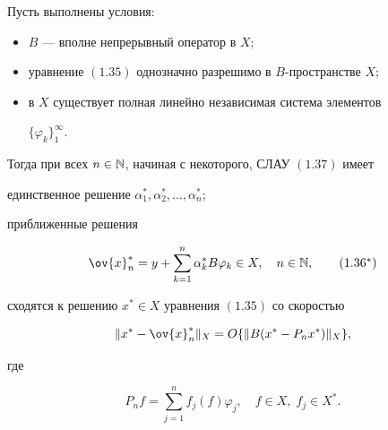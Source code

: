\begin{thms}


Пусть выполнены условия\/${:}$


\begin{itemize}


\item[а)] $B$ --- вполне непрерывный оператор в $X;$


\item[б)] уравнение $(1.35)$ однозначно разрешимо в $B$-пространстве $X;$


\item[в)] в $X$ существует полная линейно независимая система элементов


$\{\varphi_k\}_1^\infty$.


\end{itemize}


Тогда при всех $n\in \Bbb N$, начиная с некоторого, СЛАУ $(1.37)$ имеет


единственное решение $\alpha_1^*,\alpha_2^*,\dotsc ,\alpha_n^*;$


приближенные решения


\begin{equation}


\ov{x}_n^*=y+\sum_{k=1}^n\alpha_k^*B\varphi_k\in X,\quad n\in \bl{N},


\tag{$1.36^*$}


\end{equation}


сходятся к решению $x^*\in X$ уравнения $(1.35)$ со скоростью


\begin{equation}


\|x^*-\ov{x}_n^*\|_X =O\{ \|B(x^*-P_nx^*)\|_X\} ,


\end{equation}


где


\begin{equation}


P_nf=\sum_{j=1}^nf_j(f)\varphi_j,\quad f\in X,\; f_j\in X^* .


\end{equation}


\end{thms}





